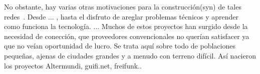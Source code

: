No obstante, hay varias otras motivaciones para la construcción(syn) de tales redes~\autocite{Vaseva2016b}.
Desde ... , hasta el disfruto de areglar problemas técnicos y aprender como funciona la tecnología.
...
Muchos de estos proyectos han surgido desde la necesidad de conección, que proveedores convencionales no querían satisfacer ya que no veían oportunidad de lucro.
Se trata aquí sobre todo de poblaciones pequeñas, ajenas de ciudades grandes y a menudo con terreno difícil.
Así nacieron los proyectos Altermundi, guifi.net, freifunk..



\begin{comment}
redes convencionales: organizadas de manera jerárquica (Telematik heranziehen?):
topología centralizada: el nodo en el centro tiene control/papel clave: si falla, toda la red se desmantela.

redes mesh: cada nodo está conectado con más de 1 otro: topología más perdurable/estable; todos los nodos son iguales;
full mesh: cada nodo está conectado directamente con cada otro: la red falla si todos los nodos fallan --> grande capacidad de recuperación

redes comunitarias: son en general redes mesh con una pretención política
características:
* infraestructura de comunicación decentralizada, creada y mantenida por la comunidad de lxs usuarixs (el estado/empresas grandes no pueden cerrarla tan facilmente) --> interesante sobre todo también para contextos autócratos (regimenes políticos antidemocráticos, vease Iran, China, Cuba, .. )
* garantizar acceso libre a información
* garantizar la libertad de expresión
* ..
* el firmware: software libre

      \item infraestructura de comunicación abierta, accesible para tod@s
      \item infraestructura creada y mantenida por la comunidad de l@s usuari@s
      \item ejemplos:
        \begin{itemize}
          \item Freifunk (Alemania)
          \item guifi.net (España/Cataluña)
          \item ninux (Italia)
          \item Funkfeuer (Austria)
        \end{itemize}

  \begin{itemize}
    \item conectar a comunidades excluidas por los proveedores convencionales de servicios Internet
    \item garantizar acceso libre a información
    \item garantizar la libertad de expreción
    \item profundizar los propios conocimientos técnicos, experimentar
    \item educar y concienciar a más gente
  \end{itemize}


\end{comment}
